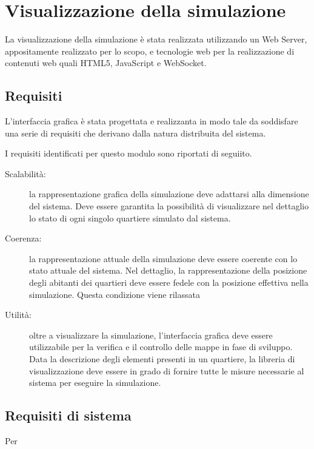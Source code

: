 \section{Visualizzazione della simulazione}
La visualizzazione della simulazione è stata realizzata utilizzando un Web
Server, appositamente realizzato per lo scopo, e tecnologie web per la
realizzazione di contenuti web quali HTML5, JavaScript e WebSocket.

\subsection{Requisiti}\label{subsec:requisiti}
L'interfaccia grafica è stata progettata e realizzanta in modo tale da
soddisfare una serie di requisiti che derivano dalla natura distribuita del
sistema. 

I requisiti identificati per questo modulo sono riportati di seguiito.

\begin{description}
	\item[Scalabilità:] la rappresentazione grafica della simulazione deve 
	adattarsi alla dimensione del sistema. Deve essere garantita la possibilità 
	di visualizzare nel dettaglio lo stato di ogni singolo quartiere simulato dal
	sistema.

	\item[Coerenza:] la rappresentazione attuale della simulazione deve essere
	coerente con lo stato attuale del sistema. Nel dettaglio, la rappresentazione
	della posizione degli abitanti dei quartieri deve essere fedele con la
	posizione effettiva nella simulazione. Questa condizione viene rilassata 
	
	\item[Utilità:] oltre a visualizzare la simulazione, l'interfaccia grafica deve
	essere utilizzabile per la verifica e il controllo delle mappe in fase di
	sviluppo. Data la descrizione degli elementi presenti in un quartiere, la
	libreria di visualizzazione deve essere in grado di fornire tutte le misure
	necessarie al sistema per eseguire la simulazione.
	
	\item[]
	
\end{description}

\subsection{Requisiti di sistema}
Per 